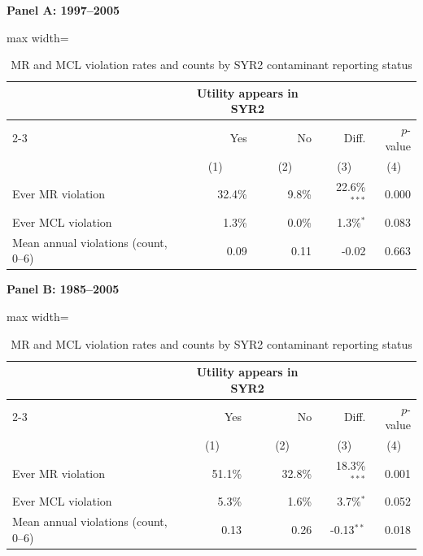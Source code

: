 \begin{table}[htbp]
\centering
\caption{MR and MCL violation rates and counts by SYR2 contaminant reporting status}
\label{tab:syr2_mr_comparison}
\textbf{Panel A: 1997--2005}\\[2pt]
\begin{adjustbox}{max width=\textwidth}
\begin{tabular}{lrrrr}
\toprule
 & \multicolumn{2}{c}{Utility appears in SYR2} & & \\
\cmidrule(lr){2-3}
 & Yes & No & Diff. & $p$-value \\
 & \multicolumn{1}{c}{(1)} & \multicolumn{1}{c}{(2)} & \multicolumn{1}{c}{(3)} & \multicolumn{1}{c}{(4)} \\
\hline
Ever MR violation & 32.4\% & 9.8\% & 22.6\%$^{***}$ & 0.000 \\
Ever MCL violation & 1.3\% & 0.0\% & 1.3\%$^{*}$ & 0.083 \\
\hline
Mean annual violations (count, 0--6) & 0.09 & 0.11 & -0.02 & 0.663 \\
\bottomrule
\end{tabular}
\end{adjustbox}
\vspace{8pt}
\textbf{Panel B: 1985--2005}\\[2pt]
\begin{adjustbox}{max width=\textwidth}
\begin{tabular}{lrrrr}
\toprule
 & \multicolumn{2}{c}{Utility appears in SYR2} & & \\
\cmidrule(lr){2-3}
 & Yes & No & Diff. & $p$-value \\
 & \multicolumn{1}{c}{(1)} & \multicolumn{1}{c}{(2)} & \multicolumn{1}{c}{(3)} & \multicolumn{1}{c}{(4)} \\
\hline
Ever MR violation & 51.1\% & 32.8\% & 18.3\%$^{***}$ & 0.001 \\
Ever MCL violation & 5.3\% & 1.6\% & 3.7\%$^{*}$ & 0.052 \\
\hline
Mean annual violations (count, 0--6) & 0.13 & 0.26 & -0.13$^{**}$ & 0.018 \\
\bottomrule
\end{tabular}
\end{adjustbox}
\end{table}

